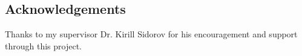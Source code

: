 \subsection*{Acknowledgements}
Thanks to my supervisor Dr. Kirill Sidorov for his encouragement and support through this project.
